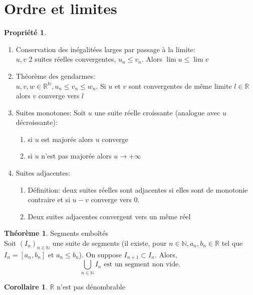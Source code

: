 \documentclass[fleqn]{article}
\theoremstyle{definition} \newtheorem*{defi}{D\'efinition}
\theoremstyle{definition} \newtheorem*{theo}{Th\'eor\`eme}
\theoremstyle{definition} \newtheorem*{prop}{Propri\'et\'e}
\theoremstyle{definition} \newtheorem*{coro}{Corollaire}
\theoremstyle{remark} \newtheorem*{rqs}{Remarque}
\begin{document}
\section{Ordre et limites}
\begin{prop} $ $
	\begin{enumerate}
		\item Conservation des in\'egalit\'ees larges par passage \`a la limite: \\
			$u, v$ 2 suites r\'eelles convergentes, $u_n \leq v_n$. Alors $\lim u \leq \lim v$
		\item Th\'eor\`eme des gendarmes: \\
			$u, v, w \in \mathbb{R}^\mathbb{N}, u_n \leq v_n \leq w_n$. Si $u$ et $v$ sont convergentes de m\^eme limite $l \in \mathbb{R}$
			alors $v$ converge vers $l$
		\item Suites monotones:
			Soit $u$ une suite r\'eelle croissante (analogue avec $u$ d\'ecroissante):
			\begin{enumerate}
				\item si $u$ est major\'ee alors $u$ converge
				\item si $u$ n'est pas major\'ee alors $u \rightarrow +\infty$
			\end{enumerate}
		\item Suites adjacentes:
			\begin{enumerate}
				\item D\'efinition: deux suites r\'eelles sont adjacentes si elles sont de monotonie contraire et si $u-v$ converge vers 0.
				\item Deux suites adjacentes convergent vers un m\^eme r\'eel
			\end{enumerate}
	\end{enumerate}
\end{prop}
\begin{theo} Segments embo\^it\'es \\
	Soit $(I_n)_{n \in \mathbb{N}}$ une suite de segments (il existe, pour
	$n \in \mathbb{N}, a_n, b_n \in \mathbb{R}$ tel que $I_n = [a_n, b_n]$ et $a_n \leq b_n$). On suppose $I_{n+1} \subset I_n$. Alors,
	\[\bigcup_{n \in \mathbb{N}} I_n \text{ est un segment non vide.}\]
\end{theo}
\begin{coro}
	$\mathbb{R}$ n'est pas d\'enombrable
\end{coro}
\end{document}
